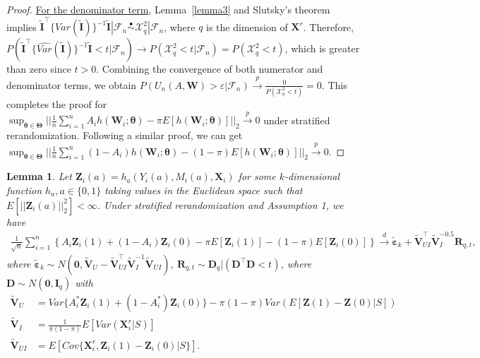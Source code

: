 \documentclass[12pt]{article}
\newtheorem{lemma}{Lemma}
\newcommand{\bX}{\boldsymbol{X}}
\newcommand{\bW}{\boldsymbol{W}}
\newcommand{\bI}{\boldsymbol{I}}
\newcommand{\bZ}{\boldsymbol{Z}}
\newcommand{\bR}{\boldsymbol{R}}
\newcommand{\bD}{\boldsymbol{D}}
\newcommand{\bzero}{\boldsymbol{0}}
\newcommand{\btheta}{\boldsymbol{\theta}}
\newcommand{\bTheta}{\boldsymbol{\Theta}}
\newcommand{\bvarepsilon}{\boldsymbol{\varepsilon}}
\newcommand{\bfV}{\mathbf{V}}
\newcommand{\tbepsilon}{\widetilde{\bvarepsilon}}
\begin{document}
\begin{proof}
\underline{For the denominator term}, Lemma~\ref{lemma3} and Slutsky's theorem implies $\widetilde{\bI}^\top \{\widehat{Var}(\widetilde{\bI})\}^{-1} \widetilde{\bI}|\mathcal{F}_n\overset{\bullet}{\sim}\mathcal{X}^2_q|\mathcal{F}_n$, where $q$ is the dimension of $\bX^r$. Therefore, $P(\widetilde{\bI}^\top \{\widehat{Var}(\widetilde{\bI})\}^{-1} \widetilde{\bI} < t|\mathcal{F}_n) \rightarrow P(\mathcal{X}^2_q < t|\mathcal{F}_n) = P(\mathcal{X}^2_q < t)$, which is greater than zero since $t > 0$. Combining the convergence of both numerator and denominator terms, we obtain $P\left(U_n(A,\bW) > \varepsilon | \mathcal{F}_n\right) \xrightarrow{p} \frac{0}{P(\mathcal{X}^2_q < t)} = 0$. This completes the proof for $\sup_{\btheta \in \bTheta}||\frac{1}{n} \sum_{i=1}^n A_i h(\bW_i;\btheta) - \pi E[h(\bW_i;\btheta)] ||_2 \xrightarrow{p} 0$ under stratified rerandomization. Following a similar proof, we can get $\sup_{\btheta \in \bTheta}||\frac{1}{n} \sum_{i=1}^n (1- A_i) h(\bW_i;\btheta) - (1-\pi) E[h(\bW_i;\btheta)] ||_2 \xrightarrow{p} 0$.
\end{proof}

\begin{lemma}\label{lemma5}
    Let $\bZ_i(a) = h_a(Y_i(a), M_i(a), \bX_i)$  for some $k$-dimensional function $h_a, a \in \{0,1\}$ taking values in the Euclidean space such that $E[||\bZ_i(a)||_2^2] < \infty$. Under stratified rerandomization and Assumption 1, we have
    \begin{align*}
        \frac{1}{\sqrt{n}}\sum_{i=1}^n \left\{A_i\bZ_i(1) + (1-A_i)\bZ_i(0) - \pi E[\bZ_i(1)] - (1-\pi) E[\bZ_i(0)]\right\} \xrightarrow{d}  \widetilde{\boldsymbol{\varepsilon}}_k + \widetilde{\bfV}_{UI}^\top \widetilde{\bfV}_I^{-0.5} \bR_{q,t},
    \end{align*}
    where $\tbepsilon_k \sim N(\bzero,\widetilde{\bfV}_U -  \widetilde{\bfV}_{UI}^\top \widetilde{\bfV}_I^{-1}\widetilde{\bfV}_{UI})$, $\bR_{q,t} \sim  \bD_q|( \bD^\top  \bD < t)$,  where $\bD \sim N(\bzero, \mathbf{I}_q)$ with
    \begin{align*}
        \widetilde{\bfV}_U &= Var\{A_i^*\bZ_i(1) + (1-A_i^*)\bZ_i(0)\} - \pi(1-\pi) Var(E[\bZ(1)-\bZ(0)|S]) \\
        \widetilde{\bfV}_I &= \frac{1}{\pi(1-\pi)}E[Var(\bX_i^r|S)] \\
        \widetilde{\bfV}_{UI} &= E[Cov\{\bX_i^r, \bZ_i(1)-\bZ_i(0)|S\}].
    \end{align*}
\end{lemma}
\end{document}
